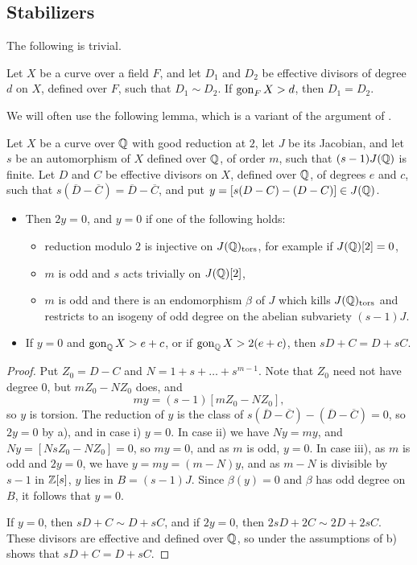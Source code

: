 \subsection{Stabilizers}
The following is trivial.

\begin{lemma}\label{lem:closed}
Let $X$ be a curve over a field $F$, and let $D_1$ and $D_2$ be effective divisors of degree $d$ on $X$, defined over $F$, such that $D_1\sim D_2$. If $\operatorname{gon}_F X>d$, then $D_1=D_2$.
\end{lemma}

We will often use the following lemma, which is a variant of the argument of \cite[Proposition 4.1]{DSt}.

\begin{lemma}\label{lem:stabgen}
Let $X$ be a curve over $\mathbb{Q}$ with good reduction at $2$, let $J$ be its Jacobian, and let $s$ be an automorphism of $X$ defined over $\mathbb{Q}$, of order $m$, such that $(s-1)J(\mathbb{Q})$ is finite. Let $D$ and $C$ be effective divisors on $X$, defined over $\mathbb{Q}$, of degrees $e$ and $c$, such that $s(\overline D-\overline C)=\overline D-\overline C$, and put $y=[s(D-C)-(D-C)]\in J(\mathbb{Q})$.
\begin{itemize}
\item[a)] Then $2y=0$, and $y=0$ if one of the following holds:
\begin{itemize}
\item[i)] reduction modulo $2$ is injective on $J(\mathbb{Q})_{\mathrm{tors}}$, for example if $J(\mathbb{Q})[2]=0$,
\item[ii)] $m$ is odd and $s$ acts trivially on $J(\mathbb{Q})[2]$,
\item[iii)] $m$ is odd and there is an endomorphism $\beta$ of $J$ which kills $J(\mathbb{Q})_{\mathrm{tors}}$ and restricts to an isogeny of odd degree on the abelian subvariety $(s-1)J$.
\end{itemize}
\item[b)] If $y=0$ and $\operatorname{gon}_{\mathbb{Q}} X>e+c$, or if $\operatorname{gon}_{\mathbb{Q}} X>2(e+c)$, then $sD+C=D+sC$.
\end{itemize}
\end{lemma}

\begin{proof}
Put $Z_0=D-C$ and $N=1+s+\dots+s^{m-1}$. Note that $Z_0$ need not have degree $0$, but $mZ_0-NZ_0$ does, and
$$my=(s-1)[mZ_0-NZ_0],$$
so $y$ is torsion. The reduction of $y$ is the class of $s(\overline D-\overline C)-(\overline D-\overline C)=0$, so $2y=0$ by  a), and in case i) $y=0$. In case ii) we have $Ny=my$, and $Ny=[NsZ_0-NZ_0]=0$, so $my=0$, and as $m$ is odd, $y=0$. In case iii), as $m$ is odd and $2y=0$, we have $y=my=(m-N)y$, and as $m-N$ is divisible by $s-1$ in $\mathbb{Z}[s]$, $y$ lies in $B=(s-1)J$. Since $\beta(y)=0$ and $\beta$ has odd degree on $B$, it follows that $y=0$.

If $y=0$, then $sD+C\sim D+sC$, and if $2y=0$, then $2sD+2C\sim 2D+2sC$. These divisors are effective and defined over $\mathbb{Q}$, so under the assumptions of b)  shows that $sD+C=D+sC$.
\end{proof}

